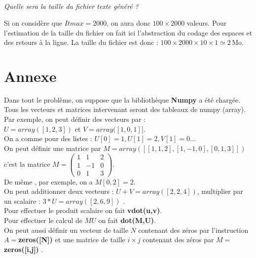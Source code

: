 \documentclass[10pt,fleqn]{article} %
\begin{document}
\begin{multicols}{2}
\begin{multicols}{2}
\subparagraph{}
\textit{Quelle sera la taille du fichier texte généré ?}
\ifprof
\begin{corrige}
Si on considère que $Itmax=2000$, on aura donc $100 \times 2000$ valeurs. Pour l'estimation de la taille du fichier on fait ici l'abstraction du codage des espaces et des retours à la ligne. 
La taille du fichier est donc : $100 \times 2000 \times 10 \times 1 \simeq 2\, \text{Mo}$.
\end{corrige}
\else
\fi

\ifprof
\else
\section{Annexe}
\noindent
Dans tout le problème, on suppose que la bibliothèque \textbf{Numpy} a été chargée.\\
Tous les vecteurs et matrices intervenant seront des tableaux de numpy (array).\\
Par exemple, on peut définir des vecteurs par :\\
 $U=array([1,2,3])$ et $V=array([1,0,1]]$.\\
On a comme pour des listes : $U[0]=1, U[1]=2, V[1]=0$...\\
On peut définir une matrice par $M=array([[1,1,2],[1,-1,0],[0,1,3]])$ c'est la matrice
 $M=\left(\begin{array}{ccc}1&1&2\\1&-1&0 \\ 0&1&3 \end{array} \right)$.\\
De même , par exemple, on a $M[0,2]=2$. \\
On peut additionner deux vecteurs : $U+V=array([2,2,4])$, multiplier par un scalaire :
$3*U=array([2,6,9])$ .\\
Pour effectuer le produit scalaire on fait \textbf{vdot(u,v)}.\\
Pour effectuer le calcul de $MU$ on fait \textbf{dot(M,U)}.\\
On peut aussi définir un vecteur de taille $N$ contenant des zéros par l'instruction 
$A=$\textbf{zeros([N])} et une matrice de taille $i\times j$ contenant des zéros par 
$M=$\textbf{zeros([i,j])} .
\fi

\ifprof
\end{multicols}
\else
\end{multicols}
\fi
\end{document}
